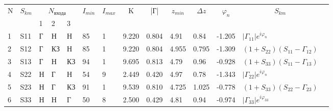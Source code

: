 \begin{tabular}{|l|l|l|l|l|l|l|l|l|l|l|l|l|l}
\cline{1-13}
\multicolumn{1}{|c|}{\multirow{2}{*}{N}} & 
\multicolumn{1}{c|}{\multirow{2}{*}{$S_{km}$}} & 
\multicolumn{3}{c|}{$N_{\text{входа}}$} & 
\multicolumn{1}{c|}{\multirow{2}{*}{$I_{min}$}} & 
\multicolumn{1}{c|}{\multirow{2}{*}{$I_{max}$}} & 
\multicolumn{1}{c|}{\multirow{2}{*}{K}} &
\multicolumn{1}{c|}{\multirow{2}{*}{|Г|}} & 
\multicolumn{1}{c|}{\multirow{2}{*}{$z_{min}$}} & 
\multicolumn{1}{c|}{\multirow{2}{*}{$\Delta z$}} & 
\multicolumn{1}{c|}{\multirow{2}{*}{$\varphi_n$}} & 
\multicolumn{1}{c|}{\multirow{2}{*}{$S_{km}$}} &  \\ \cline{3-5}
\multicolumn{1}{|c|}{} & 
\multicolumn{1}{c|}{}        & 
1&2&3& \multicolumn{1}{c|}{}&\multicolumn{1}{c|}{}&
\multicolumn{1}{c|}{}&\multicolumn{1}{c|}{}& 
\multicolumn{1}{c|}{}&\multicolumn{1}{c|}{}& 
\multicolumn{1}{c|}{}&\multicolumn{1}{c|}{}& \\ \cline{1-13}
1 & S11 & Г & Н & Н & 85 & 1 & 9.220 & 0.804 & 4.91 &0.84 & -1.205 & $|\Gamma_{11}|e^{i\varphi_n}$    &  \\ \cline{1-13}
2 & S12 & Г & КЗ& Н & 85 & 1 & 9.220 & 0.804 & 4.955& 0.795& -1.309 & $(1+S_{22})(S_{11}-\Gamma_{12})$ &  \\ \cline{1-13}
3 & S13 & Г & Н & КЗ& 94 & 1 & 9.695 & 0.813 & 4.79 & 0.96& -0.928 & $(1+S_{33})(S_{11}-\Gamma_{13})$ &  \\ \cline{1-13}
4 & S22 & Н & Г & Н & 54 & 9 & 2.449 & 0.420 & 4.97 &0.78 & -1.343 & $|\Gamma_{22}|e^{i\varphi_n}$    &  \\ \cline{1-13}
5 & S23 & Н & Г & КЗ& 91 & 1 & 9.539 & 0.810 & 4.725&1.025 & -0.778 & $(1+S_{33})(S_{22}-\Gamma_{23})$ &  \\ \cline{1-13}
6 & S33 & Н & Н & Г & 50 & 8 & 2.500 & 0.429 & 4.81 &0.94 & -0.974 & $|\Gamma_{33}|e^{i\varphi_{33}}$ &  \\ \cline{1-13}
\end{tabular}
